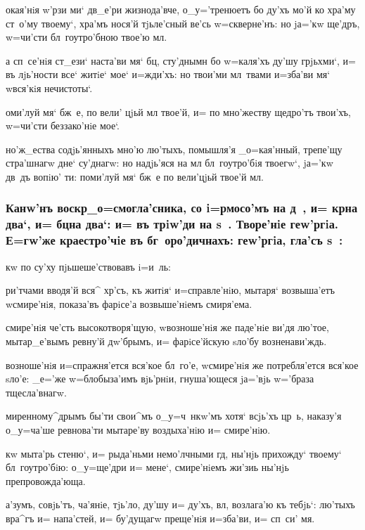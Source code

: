 \documentclass[12pt,a5paper,dvips,civil=antiqua]{hipbook}
\begin{document}
 окая'нiя w'рзи ми` дв_е'ри жизнода'вче,
о_у='тренюетъ бо ду'хъ мо'й ко хра'му ст~о'му твоему`, хра'мъ нося'й
тjьле'сный ве'сь w=скверне'нъ: но jа='кw ще'дръ, w=чи'сти
бл~гоутро'бною твое'ю мл.

 а сп~се'нiя ст_ези` наста'ви
мя` бц, сту'днымн бо w=каля'хъ ду'шу грjьхми`, и= въ лjь'ности все`
житiе` мое` и=жди'хъ: но твои'ми мл~твами и=зба'ви мя` w\т вся'кiя
нечистоты`.

 оми'луй мя` бж~е, по вели' цjьй мл
твое'й, и= по мно'жеству щедро'тъ твои'хъ, w=чи'сти беззако'нiе мое`.

но'ж_ества содjь'янныхъ мно'ю лю'тыхъ, помышля'я _о=кая'нный,
трепе'щу стра'шнагw дне` су'днагw: но надjь'яся на мл
бл~гоутро'бiя твоегw`, jа='кw дв~дъ вопiю' ти: поми'луй мя` бж~е по
вели'цjьй твое'й мл.

\subsubsection[Канw'нъ]{Канw'нъ воскр _о=смогла'сника, со i=рмосо'мъ на д~, и=
  кр на два`, и= бц на два`: и= въ трiw'ди на s~.
  Творе'нiе геw'ргiа. Е=гw'же краестро'чiе въ бг~оро'дичнахъ:
  геw'ргiа, гла'съ s~:}

 кw по су'ху пjьшеше'ствовавъ i=и~ль: 

ри'тчами вводя'й вся^ хр'съ, къ житiя` и=справле'нiю,
мытаря` возвыша'етъ w\т смире'нiя, показа'въ фарiсе'а возвыше'нiемъ
смиря'ема.

 смире'нiя че'сть высокотворя'щую, w\т возноше'нiя же
паде'нiе ви'дя лю'тое, мытар_е'вымъ ревну'й дw'брымъ, и= фарiсе'йскую
sло'бу возненави'ждь.

 возноше'нiя и=спражня'ется вся'кое бл~го'е, w\т смире'нiя
же потребля'ется вся'кое sло'е: _е='же w=блобыза'имъ вjь'рнiи,
гнуша'ющеся jа='вjь w='браза тщесла'внагw.

миренному^дрымъ бы'ти свои^мъ о_у=ч~нкw'мъ хотя` всjь'хъ цр~ь,
наказу'я о_у=ча'ше ревнова'ти мытаре'ву воздыха'нiю и= смире'нiю.

 кw мыта'рь стеню`, и= рыда'ньми немо'лчными
гд, ны'нjь прихожду` твоему` бл~гоутро'бiю: о_у=ще'дри и= мене`,
смире'нiемъ жи'зиь ны'нjь препровожда'юща.

 а'зумъ, совjь'тъ, ча'янiе,
тjь'ло, ду'шу и= ду'хъ, вл, возлага'ю къ тебjь`: лю'тыхъ вра^гъ
и= напа'стей, и= бу'дущагw преще'нiя и=зба'ви, и= сп~си' мя.
\end{document}
